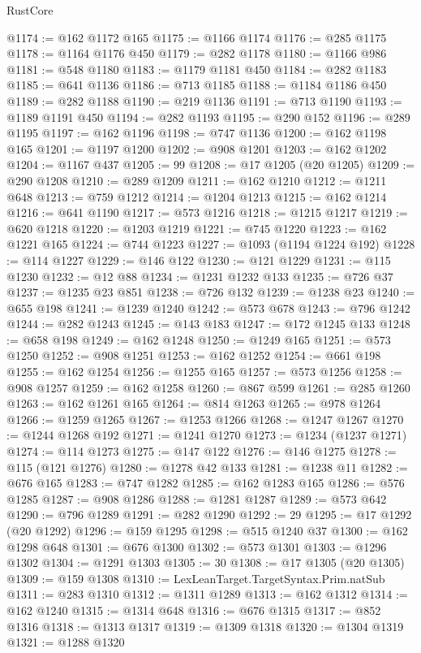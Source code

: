 \begin{lexlean}{RustCore}
\begin{coremodule}
@1174 := @162 @1172 @165
@1175 := @1166 @1174
@1176 := @285 @1175
@1178 := @1164 @1176 @450
@1179 := @282 @1178
@1180 := @1166 @986
@1181 := @548 @1180
@1183 := @1179 @1181 @450
@1184 := @282 @1183
@1185 := @641 @1136
@1186 := @713 @1185
@1188 := @1184 @1186 @450
@1189 := @282 @1188
@1190 := @219 @1136
@1191 := @713 @1190
@1193 := @1189 @1191 @450
@1194 := @282 @1193
@1195 := @290 @152
@1196 := @289 @1195
@1197 := @162 @1196
@1198 := @747 @1136
@1200 := @162 @1198 @165
@1201 := @1197 @1200
@1202 := @908 @1201
@1203 := @162 @1202
@1204 := @1167 @437
@1205 := 99
@1208 := @17 @1205 (@20 @1205)
@1209 := @290 @1208
@1210 := @289 @1209
@1211 := @162 @1210
@1212 := @1211 @648
@1213 := @759 @1212
@1214 := @1204 @1213
@1215 := @162 @1214
@1216 := @641 @1190
@1217 := @573 @1216
@1218 := @1215 @1217
@1219 := @620 @1218
@1220 := @1203 @1219
@1221 := @745 @1220
@1223 := @162 @1221 @165
@1224 := @744 @1223
@1227 := @1093 (@1194 @1224 @192)
@1228 := @114 @1227
@1229 := @146 @122
@1230 := @121 @1229
@1231 := @115 @1230
@1232 := @12 @88
@1234 := @1231 @1232 @133
@1235 := @726 @37
@1237 := @1235 @23 @851
@1238 := @726 @132
@1239 := @1238 @23
@1240 := @655 @198
@1241 := @1239 @1240
@1242 := @573 @678
@1243 := @796 @1242
@1244 := @282 @1243
@1245 := @143 @183
@1247 := @172 @1245 @133
@1248 := @658 @198
@1249 := @162 @1248
@1250 := @1249 @165
@1251 := @573 @1250
@1252 := @908 @1251
@1253 := @162 @1252
@1254 := @661 @198
@1255 := @162 @1254
@1256 := @1255 @165
@1257 := @573 @1256
@1258 := @908 @1257
@1259 := @162 @1258
@1260 := @867 @599
@1261 := @285 @1260
@1263 := @162 @1261 @165
@1264 := @814 @1263
@1265 := @978 @1264
@1266 := @1259 @1265
@1267 := @1253 @1266
@1268 := @1247 @1267
@1270 := @1244 @1268 @192
@1271 := @1241 @1270
@1273 := @1234 (@1237 @1271)
@1274 := @114 @1273
@1275 := @147 @122
@1276 := @146 @1275
@1278 := @115 (@121 @1276)
@1280 := @1278 @42 @133
@1281 := @1238 @11
@1282 := @676 @165
@1283 := @747 @1282
@1285 := @162 @1283 @165
@1286 := @576 @1285
@1287 := @908 @1286
@1288 := @1281 @1287
@1289 := @573 @642
@1290 := @796 @1289
@1291 := @282 @1290
@1292 := 29
@1295 := @17 @1292 (@20 @1292)
@1296 := @159 @1295
@1298 := @515 @1240 @37
@1300 := @162 @1298 @648
@1301 := @676 @1300
@1302 := @573 @1301
@1303 := @1296 @1302
@1304 := @1291 @1303
@1305 := 30
@1308 := @17 @1305 (@20 @1305)
@1309 := @159 @1308
@1310 := LexLeanTarget.TargetSyntax.Prim.natSub
@1311 := @283 @1310
@1312 := @1311 @1289
@1313 := @162 @1312
@1314 := @162 @1240
@1315 := @1314 @648
@1316 := @676 @1315
@1317 := @852 @1316
@1318 := @1313 @1317
@1319 := @1309 @1318
@1320 := @1304 @1319
@1321 := @1288 @1320

\end{coremodule}
\end{lexlean}
